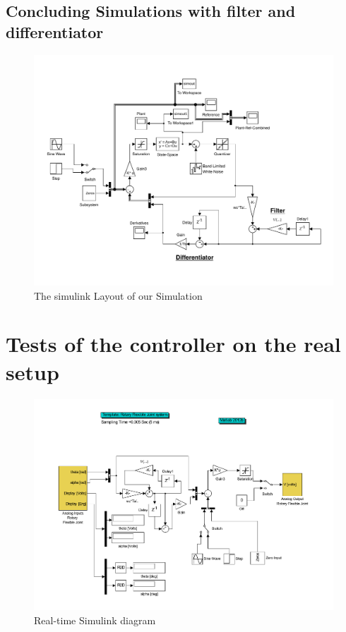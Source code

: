 \documentclass[ twoside,openright,titlepage,numbers=noenddot,headinclude,%
                footinclude=true,cleardoublepage=empty,abstractoff, %
                BCOR=5mm,paper=a4,fontsize=11pt,%
                ngerman,american,%
                ]{scrreprt}
\begin{document}
{\section{Concluding Simulations with filter and differentiator}
\begin{figure}
\includegraphics[scale=0.5]{images/simModel.pdf}
\caption{The simulink Layout of our Simulation}
\end{figure}



\chapter{Tests of the controller on the real setup}

\begin{figure} \label{realtimeSimDiagram}
  \centering
  \includegraphics[scale=0.4]{images/realtimeSimDiagram}
  \caption{Real-time Simulink diagram} 
\end{figure}

}
\end{document}
